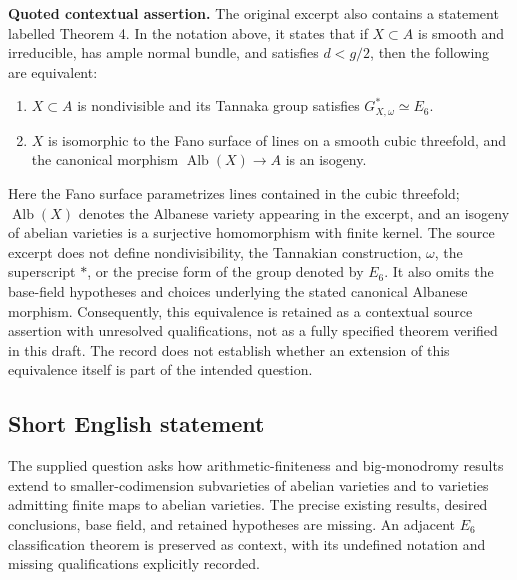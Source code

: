 \documentclass[11pt]{article}
\begin{document}
\textbf{Quoted contextual assertion.} The original excerpt also contains a statement labelled Theorem 4. In the notation above, it states that if \(X\subset A\) is smooth and irreducible, has ample normal bundle, and satisfies \(d<g/2\), then the following are equivalent:
\begin{enumerate}
\item[(a)] \(X\subset A\) is nondivisible and its Tannaka group satisfies \(G^{*}_{X,\omega}\simeq E_6\).
\item[(b)] \(X\) is isomorphic to the Fano surface of lines on a smooth cubic threefold, and the canonical morphism \(\operatorname{Alb}(X)\to A\) is an isogeny.
\end{enumerate}
Here the Fano surface parametrizes lines contained in the cubic threefold; \(\operatorname{Alb}(X)\) denotes the Albanese variety appearing in the excerpt, and an isogeny of abelian varieties is a surjective homomorphism with finite kernel. The source excerpt does not define nondivisibility, the Tannakian construction, \(\omega\), the superscript \(*\), or the precise form of the group denoted by \(E_6\). It also omits the base-field hypotheses and choices underlying the stated canonical Albanese morphism. Consequently, this equivalence is retained as a contextual source assertion with unresolved qualifications, not as a fully specified theorem verified in this draft. The record does not establish whether an extension of this equivalence itself is part of the intended question.
\subsection{Short English statement}
The supplied question asks how arithmetic-finiteness and big-monodromy results extend to smaller-codimension subvarieties of abelian varieties and to varieties admitting finite maps to abelian varieties. The precise existing results, desired conclusions, base field, and retained hypotheses are missing. An adjacent \(E_6\) classification theorem is preserved as context, with its undefined notation and missing qualifications explicitly recorded.
\end{document}
